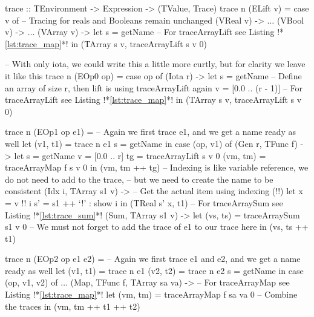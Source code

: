         \begin{haskell}[caption=Tracing away arrays, label=lst:trace_array, gobble=12]
            trace :: TEnvironment -> Expression -> (TValue, Trace)
            trace n (ELift v) =
                case v of
                    -- Tracing for reals and Booleans remain unchanged
                    (VReal  v) -> $\ldots$
                    (VBool  v) -> $\ldots$
                    (VArray v) -> let s = getName
                                  -- For traceArrayLift see Listing !*\ref{lst:trace_map}*!
                                  in  (TArray s v, traceArrayLift s v 0)
            
            -- With only iota, we could write this a little more curtly, but for clarity we leave it like this
            trace n (EOp0 op) =
                case op of
                    (Iota r) -> 
                        let s = getName
                            -- Define an array of size r, then lift is using traceArrayLift again
                            v = [0.0 .. (r - 1)]
                            -- For traceArrayLift see Listing !*\ref{lst:trace_map}*!
                        in  (TArray s v, traceArrayLift s v 0)
            
            trace n (EOp1 op e1) =
                -- Again we first trace e1, and we get a name ready as well
                let (v1, t1) = trace n e1
                    s = getName
                in  case (op, v1) of
                    (Gen r, TFunc f) ->
                        let s  = getName
                            v  = [0.0 .. r]                            
                            tg = traceArrayLift s v 0
                            (vm, tm) = traceArrayMap f s v 0
                        in  (vm, tm ++ tg)
                    -- Indexing is like variable reference, we do not need to add to the trace,
                    -- but we need to create the name to be consistent
                    (Idx i, TArray s1 v) ->
                        -- Get the actual item using indexing (!!)
                        let x  = v !! i
                            s' = s1 ++ `!' : show i
                        in  (TReal s' x, t1)
                    -- For traceArraySum see Listing !*\ref{lst:trace_sum}*!
                    (Sum, TArray s1 v) ->
                        let (vs, ts) = traceArraySum s1 v 0
                        -- We must not forget to add the trace of e1 to our trace here
                        in  (vs, ts ++ t1)

            trace n (EOp2 op e1 e2) =
                -- Again we first trace e1 and e2, and we get a name ready as well
                let (v1, t1) = trace n e1
                    (v2, t2) = trace n e2
                    s = getName
                in  case (op, v1, v2) of
                    $\ldots$
                    (Map, TFunc f, TArray sa va) ->
                        -- For traceArrayMap see Listing !*\ref{lst:trace_map}*!
                        let (vm, tm) = traceArrayMap f sa va 0
                        -- Combine the traces
                        in  (vm, tm ++ t1 ++ t2)
        \end{haskell}


